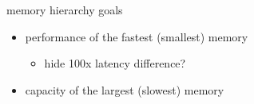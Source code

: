 
\begin{frame}{memory hierarchy goals}
\begin{itemize}
    \item performance of the fastest (smallest) memory
        \begin{itemize}
            \item hide 100x latency difference? 
        \end{itemize}
    \item capacity of the largest (slowest) memory
\end{itemize}
\end{frame}
